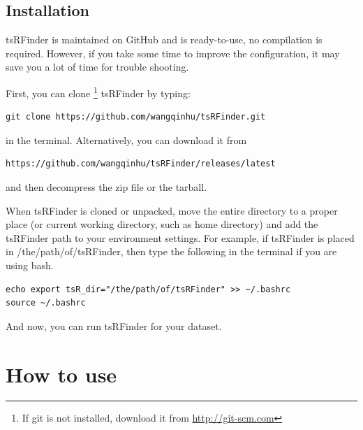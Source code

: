 \documentclass[11pt, a4paper]{article}
\begin{document}
\subsection{Installation}

tsRFinder is maintained on GitHub and is ready-to-use, no compilation is required. However, if you take some time to improve the configuration, it may save you a lot of time for trouble shooting.

First, you can clone \footnote{If git is not installed, download it from \url{http://git-scm.com}} tsRFinder by typing:

{\footnotesize \begin{tcolorbox}[colback=blue!5!white,colframe=blue!75!black,title=Clone tsRFinder]
\begin{verbatim}
git clone https://github.com/wangqinhu/tsRFinder.git
\end{verbatim}
\end{tcolorbox}}

in the terminal. Alternatively, you can download it from

{\footnotesize \begin{tcolorbox}[colback=blue!5!white,colframe=blue!75!black,title=Latest release of tsRFinder]
\begin{verbatim}
https://github.com/wangqinhu/tsRFinder/releases/latest
\end{verbatim}
\end{tcolorbox}}

and then decompress the zip file or the tarball.

When tsRFinder is cloned or unpacked, move the entire directory to a proper place (or current working directory, such as home directory) and add the tsRFinder path to your environment settings. For example, if tsRFinder is placed in /the/path/of/tsRFinder, then type the following in the terminal if you are using bash.


{\footnotesize \begin{tcolorbox}[colback=blue!5!white,colframe=blue!75!black,title=Setup tsRFinder]
\begin{verbatim}
echo export tsR_dir="/the/path/of/tsRFinder" >> ~/.bashrc
source ~/.bashrc
\end{verbatim}
\end{tcolorbox}}

And now, you can run tsRFinder for your dataset.

\section{How to use}
\end{document}
